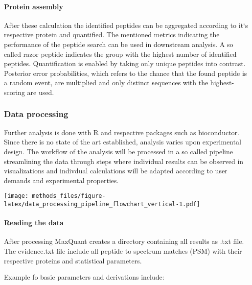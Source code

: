 \documentclass[
]{article}
\begin{document}
\hypertarget{protein-assembly}{%
\paragraph{Protein assembly}\label{protein-assembly}}

After these calculation the identified peptides can be aggregated
according to it`s respective protein and quantified. The mentioned
metrics indicating the performance of the peptide search can be used in
downstream analysis. A so called razor peptide indicates the group with
the highest number of identified peptides. Quantification is enabled by
taking only unique peptides into contrast. Posterior error
probabilities, which refers to the chance that the found peptide is a
random event, are multiplied and only distinct sequences with the
highest-scoring are used.

\hypertarget{data-processing}{%
\subsubsection{Data processing}\label{data-processing}}

Further analysis is done with R and respective packages such as
bioconductor. Since there is no state of the art established, analysis
varies upon experimental design. The workflow of the analysis will be
processed in a so called pipeline streamlining the data through steps
where individual results can be observed in visualizations and indivdual
calculations will be adapted according to user demands and experimental
properties.

\texttt{[image: methods\_files/figure-latex/data\_processing\_pipeline\_flowchart\_vertical-1.pdf]}

\hypertarget{reading-the-data}{%
\paragraph{Reading the data}\label{reading-the-data}}

After processing MaxQuant creates a directory containing all results as
.txt file. The evidence.txt file include all peptide to spectrum matches
(PSM) with their respective proteins and statistical parameters.

Example fo basic parameters and derivations include:
\end{document}

